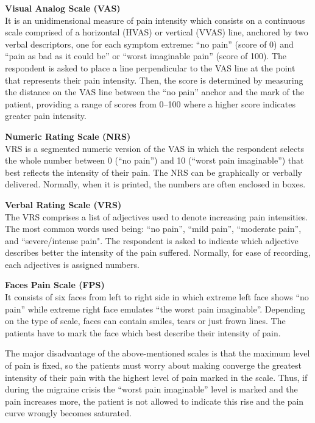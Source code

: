 \begin{description}
	
	\item{\textbf{Visual Analog Scale (VAS)}\hfill \\
	It is an unidimensional measure of pain intensity which consists on a continuous scale comprised of a horizontal (HVAS) or vertical (VVAS) line, anchored by two verbal descriptors, one for each symptom extreme: ``no pain'' (score of 0) and ``pain as bad as it could be'' or ``worst imaginable pain'' (score of 100). The respondent is asked to place a line perpendicular to the VAS line at the point that represents their pain intensity. Then, the score is determined by measuring the distance on the VAS line between the ``no pain'' anchor and the mark of the patient, providing a range of scores from 0–100 where a higher score indicates greater pain intensity.
	}
	\item{\textbf{Numeric Rating Scale (NRS)}\hfill \\
	VRS is a segmented numeric version of the VAS in which the respondent selects the whole number between 0 (``no pain'') and 10 (``worst pain imaginable'') that best reflects the intensity of their pain. The NRS can be graphically or verbally delivered. Normally, when it is printed, the numbers are often enclosed in boxes.
	}
	\item{\textbf{Verbal Rating Scale (VRS)}\hfill \\
	The VRS comprises a list of adjectives used to denote increasing pain intensities. The most common words used being: ``no pain'', ``mild  pain'', ``moderate pain'',  and  ``severe/intense  pain". The respondent is asked to indicate which adjective describes better the intensity of the pain suffered. Normally, for  ease  of  recording,  each  adjectives  is assigned  numbers.
	}
	\item{\textbf{Faces Pain Scale (FPS)}\hfill \\
	It consists of six faces from left to right side in which extreme left face shows ``no pain'' while extreme right face emulates ``the worst pain imaginable''. Depending on the type of scale, faces can contain smiles, tears or just frown lines. The patients have to mark the face which best describe their intensity of pain.
	}

\end{description}

The major disadvantage of the above-mentioned scales is that the maximum level of pain is fixed, so the patients must worry about making converge the greatest intensity of their pain with the highest level of pain marked in the scale. Thus, if during the migraine crisis the ``worst pain imaginable'' level is marked and the pain increases more, the patient is not allowed to indicate this rise and the pain curve wrongly becomes saturated.

